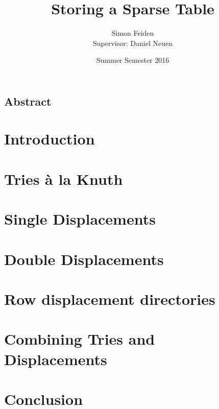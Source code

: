 \documentclass[12pt]{article}
\title{Storing a Sparse Table}
\date{Summer Semester 2016}
\author{Simon Feiden\\Supervisor: Daniel Neuen}
\begin{document}
\maketitle
\thispagestyle{empty}

\vspace*{2em}

\begin{center}
	\begin{minipage}[t]{0.8\textwidth}
		\section*{Abstract} %
		
	\end{minipage}
\end{center}

\vspace*{1em}

\section*{Introduction}




\section*{Tries à la Knuth}




\section*{Single Displacements}




\section*{Double Displacements}




\section*{Row displacement directories}




\section*{Combining Tries and Displacements}



\section*{Conclusion}





\end{document}
